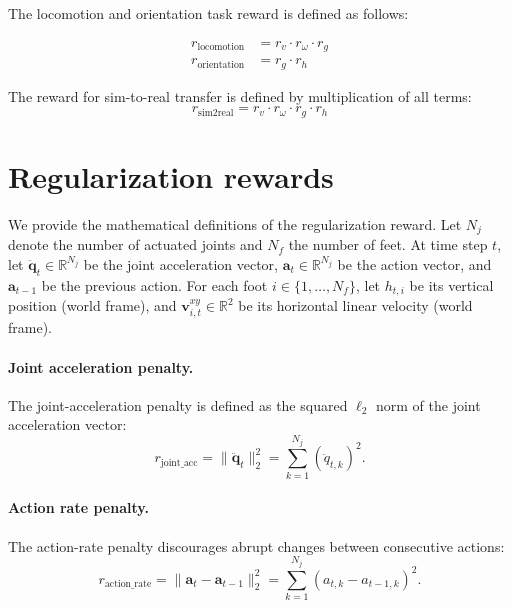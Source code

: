 The locomotion and orientation task reward is defined as follows:

\begin{align}
r_{\text{locomotion}} &= r_v \cdot r_\omega \cdot r_g \\
r_{\text{orientation}} &= r_g \cdot r_h
\end{align}

The reward for sim-to-real transfer is defined by multiplication of all terms:
\begin{equation}
r_{\text{sim2real}} = r_v \cdot r_\omega \cdot r_g \cdot r_h
\end{equation}

\section{Regularization rewards}
\label{appendix:regularization_reward}

We provide the mathematical definitions of the regularization reward.  Let $N_j$ denote the number of actuated joints and $N_f$ the number of feet. At time step $t$, let $\ddot{\mathbf{q}}_t \in \mathbb{R}^{N_j}$ be the joint acceleration vector, $\mathbf{a}_t \in \mathbb{R}^{N_j}$ be the action vector, and $\mathbf{a}_{t-1}$ be the previous action.  For each foot $i \in \{1,\dots,N_f\}$, let $h_{t,i}$ be its vertical position (world frame), and $\mathbf{v}^{xy}_{i,t} \in \mathbb{R}^{2}$ be its horizontal linear velocity (world frame). \\

\paragraph{Joint acceleration penalty.}
The joint-acceleration penalty is defined as the squared $\ell_2$ norm of the joint acceleration vector:
\begin{equation}
r_{\text{joint\_acc}}
=
\|\ddot{\mathbf{q}}_t\|_2^2
=
\sum_{k=1}^{N_j} \left(\ddot{q}_{t,k}\right)^2 .
\end{equation}

\paragraph{Action rate penalty.}
The action-rate penalty discourages abrupt changes between consecutive actions:
\begin{equation}
r_{\text{action\_rate}}
=
\|\mathbf{a}_t - \mathbf{a}_{t-1}\|_2^2
=
\sum_{k=1}^{N_j} \left(a_{t,k}-a_{t-1,k}\right)^2 .
\end{equation}

